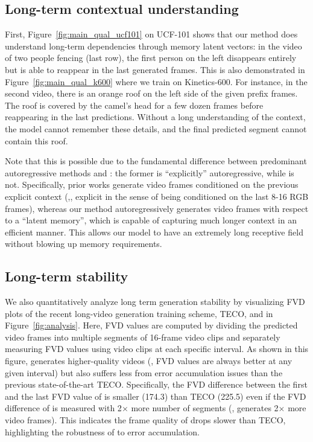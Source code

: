 \subsection{Long-term contextual understanding}
First, Figure~\ref{fig:main_qual_ucf101} on UCF-101 shows that our method does understand long-term dependencies through memory latent vectors: in the video of two people fencing (last row), the first person on the left disappears entirely but is able to reappear in the last generated frames.
This is also demonstrated in Figure~\ref{fig:main_qual_k600} where we train on Kinetics-600. For instance, in the second video, there is an orange roof on the left side of the given prefix frames. The roof is covered by the camel's head for a few dozen frames before reappearing in the last predictions. Without a long understanding of the context, the model cannot remember these details, and the final predicted segment cannot contain this roof. 

Note that this is possible due to the fundamental difference between predominant autoregressive methods and \sname: the former is ``explicitly'' autoregressive, while \sname is not. Specifically, prior works generate video frames conditioned on the previous explicit context (\eg,, explicit in the sense of being conditioned on the last 8-16 RGB frames), whereas our method autoregressively generates video frames with respect to a ``latent memory'', which is capable of capturing much longer context in an efficient manner. This allows our model to have an extremely long receptive field without blowing up memory requirements.


\subsection{Long-term stability}
We also quantitatively analyze long term generation stability by visualizing FVD plots of the recent long-video generation training scheme, TECO, and \sname in Figure~\ref{fig:analysis}. Here, FVD values are computed by dividing the predicted video frames into multiple segments of 16-frame video clips and separately measuring FVD values using video clips at each specific interval. As shown in this figure, \sname generates higher-quality videos (\ie, FVD values are always better at any given interval) but also suffers less from error accumulation issues than the previous state-of-the-art TECO. Specifically, the FVD difference between the first and the last FVD value of \sname is smaller (174.3) than TECO (225.5) even if the FVD difference of \sname is measured with 2$\times$ more number of segments (\ie, \sname generates 2$\times$ more video frames). This indicates the frame quality of \sname drops slower than TECO, highlighting the robustness of \sname to error accumulation. 

